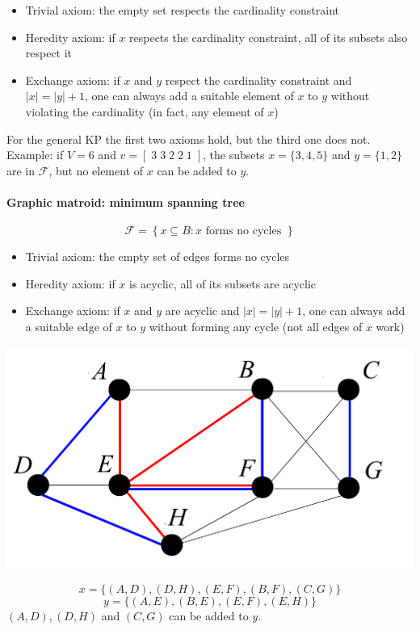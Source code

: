 \begin{itemize}
	\item Trivial axiom: the empty set respects the cardinality constraint
	\item Heredity axiom: if $x$ respects the cardinality constraint, all of its subsets also respect it
	\item Exchange axiom: if $x$ and $y$ respect the cardinality constraint and $|x| = |y| + 1$, one can always add a suitable element of $x$ to $y$ without violating the cardinality (in fact, any element of $x$)
\end{itemize}

For the general KP the first two axioms hold, but the third one does not.\\
Example: if $V = 6$ and $v = [\; 3 \; 3 \; 2 \; 2 \; 1 \; ]$, the subsets $x = \{3, 4, 5\}$ and $y = \{1, 2\}$ are in $\mathcal{F}$, but no element of $x$ can be added to $y$.\\

\newpage

\paragraph{Graphic matroid: minimum spanning tree}
$$ \mathcal{F} = \left\{x \subseteq B : x \text{ forms no cycles }\right\}$$

\begin{itemize}
	\item Trivial axiom: the empty set of edges forms no cycles
	\item Heredity axiom: if $x$ is acyclic, all of its subsets are acyclic
	\item Exchange axiom: if $x$ and $y$ are acyclic and $|x| = |y | + 1$, one can always add a suitable edge of $x$ to $y$ without forming any cycle (not all edges of $x$ work)
\end{itemize}
\begin{center}
	\includegraphics[width=0.6\columnwidth]{img/matroid1}
\end{center}
$$ x = \{(A, D) , (D, H) , (E , F ) , (B, F ) , (C , G )\} $$
$$ y = \{(A, E ) , (B, E ) , (E , F ) , (E , H)\} $$
$(A, D), (D, H)$ and $(C , G )$ can be added to $y$.\\


